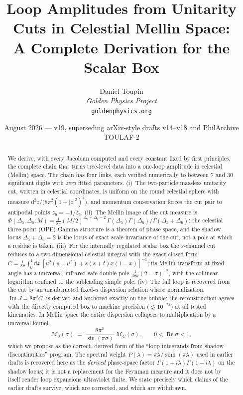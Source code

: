\documentclass[12pt,a4paper]{article}
\title{Loop Amplitudes from Unitarity Cuts in Celestial Mellin Space:\\[4pt]
A Complete Derivation for the Scalar Box}
\author{Daniel Toupin\\[4pt]
\textit{Golden Physics Project}\\[2pt]
\texttt{goldenphysics.org}}
\date{August 2026 --- v19, superseding arXiv-style drafts v14--v18 and PhilArchive TOULAF-2}
\theoremstyle{plain}
\theoremstyle{definition}
\theoremstyle{remark}
\newcommand{\dd}{\mathrm{d}}
\newcommand{\cM}{\mathcal{M}}
\begin{document}
\maketitle

\begin{abstract}
\noindent
We derive, with every Jacobian computed and every constant fixed by
first principles, the complete chain that turns tree-level data into a
one-loop amplitude in celestial (Mellin) space.  The chain has four
links, each verified numerically to between $7$ and $30$ significant
digits with \emph{zero} fitted parameters.
(i)~The two-particle massless unitarity cut, written in celestial
coordinates, is uniform on the round celestial sphere with measure
$\dd^2z/\bigl(8\pi^2(1+|z|^2)^2\bigr)$, and momentum conservation forces
the cut pair to antipodal points $z_6=-1/\bar z_5$.
(ii)~The Mellin image of the cut measure is
$\Phi(\Delta_5,\Delta_6;M)=\tfrac{1}{8\pi}(M/2)^{\Delta_5+\Delta_6-2}
\,\Gamma(\Delta_5)\Gamma(\Delta_6)/\Gamma(\Delta_5+\Delta_6)$: the
celestial three-point (OPE) Gamma structure is a theorem of phase space,
and the shadow locus $\Delta_5+\Delta_6=2$ is the locus of exact scale
invariance of the cut, not a pole at which a residue is taken.
(iii)~For the internally regulated scalar box the $s$-channel cut
reduces to a two-dimensional celestial integral with the exact closed
form $C=\tfrac{1}{8\pi}\int_0^1\dd x\,[\mu^2(s+\mu^2)+s(s+t)x(1-x)]^{-1}$;
its Mellin transform at fixed angle has a universal, infrared-safe
double pole $\tfrac{1}{4\pi\kappa}(2-\sigma)^{-2}$, with the collinear
logarithm confined to the subleading simple pole.
(iv)~The full loop is recovered from the cut by an unsubtracted
fixed-$u$ dispersion relation whose normalization,
$\operatorname{Im}J=8\pi^2 C$, is derived and anchored exactly on the
bubble; the reconstruction agrees with the directly computed box to
machine precision ($\lesssim 10^{-21}$) at all tested kinematics.  In
Mellin space the entire dispersion collapses to multiplication by a
universal kernel,
\[
\cM_{J}(\sigma)\;=\;\frac{8\pi^2}{\sin(\pi\sigma)}\;\cM_{C}(\sigma),
\qquad 0<\operatorname{Re}\sigma<1 ,
\]
which we propose as the correct, derived form of the ``loop integrands
from shadow discontinuities'' program.  The spectral weight
$P(\lambda)=\pi\lambda/\sinh(\pi\lambda)$ used in earlier drafts is
recovered here as the \emph{derived} phase-space factor
$\Gamma(1{+}i\lambda)\Gamma(1{-}i\lambda)$ on the shadow locus; it is
not a replacement for the Feynman measure and it does not by itself
render loop expansions ultraviolet finite.  We state precisely which
claims of the earlier drafts survive, which are corrected, and which
are withdrawn.
\end{abstract}
\end{document}
